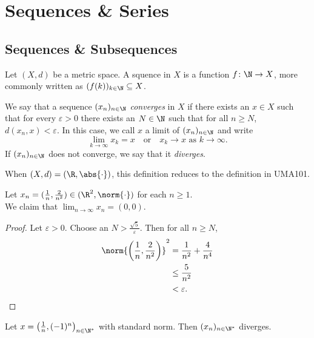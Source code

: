 \chapter{Sequences \& Series}
\section{Sequences \& Subsequences} \label{sec:seq}
\begin{definition}
    Let $(X, d)$ be a metric space.
    A squence in $X$ is a function $f\colon \N \to X$, more commonly written
    as $(f(k))_{k \in \N} \subseteq X$.

    We say that a sequence $(x_n)_{n \in \N}$ \emph{converges} in $X$ if
    there exists an $x \in X$ such that for every $\varepsilon > 0$ there
    exists an $N \in \N$ such that for all $n \geq N$,
    $d(x_n, x) < \varepsilon$.
    In this case, we call $x$ a limit of $(x_n)_{n \in \N}$ and write \[
        \lim_{k \to \infty} x_k = x \quad \text{or}
        \quad x_k \to x \text{ as } k \to \infty.
    \]
    If $(x_n)_{n \in \N}$ does not converge, we say that it \emph{diverges}.
\end{definition}
\begin{examples}
    \item When $(X, d) = (\R, \abs{\cdot})$, this definition reduces to the
    definition in UMA101.
    \item Let $x_n = (\frac1n, \frac{2}{n^2}) \in (\R^2, \norm{\cdot})$ for
    each $n \ge 1$. \\
    We claim that $\lim_{n \to \infty} x_n = (0, 0)$.
    \begin{proof}
        Let $\varepsilon > 0$.
        Choose an $N > \frac{\sqrt 5}{\varepsilon}$.
        Then for all $n \ge N$, \begin{align*}
            \norm{\left(\frac1n, \frac{2}{n^2}\right)}^2
                &= \frac1{n^2} + \frac{4}{n^4} \\
                &\le \frac{5}{n^2} \\
                &< \varepsilon. \qedhere
        \end{align*}
    \end{proof}
    \item Let $x = \left(\frac1n, (-1)^n\right)_{n \in \N^*}$ with standard
    norm.
    Then $(x_n)_{n \in \N^*}$ diverges.
\end{examples}

